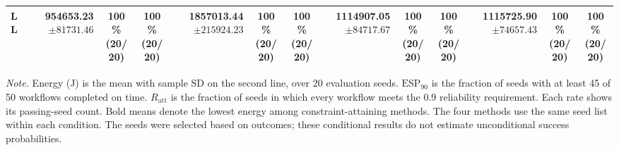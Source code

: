 \documentclass[10pt]{article}
\begin{document}
\begin{table}[!htbp]
\begin{tabular}{@{}l*{4}{rcc}@{}}
LL & \shortstack[r]{\textbf{954653.23}\\$\pm 81731.46$} & \shortstack[c]{100\%\\(20/20)} & \shortstack[c]{100\%\\(20/20)} & \shortstack[r]{1857013.44\\$\pm 215924.23$} & \shortstack[c]{100\%\\(20/20)} & \shortstack[c]{100\%\\(20/20)} & \shortstack[r]{1114907.05\\$\pm 84717.67$} & \shortstack[c]{100\%\\(20/20)} & \shortstack[c]{100\%\\(20/20)} & \shortstack[r]{1115725.90\\$\pm 74657.43$} & \shortstack[c]{100\%\\(20/20)} & \shortstack[c]{100\%\\(20/20)} \\
\bottomrule
\end{tabular}
\par\vspace{3pt}
\parbox{\textwidth}{\footnotesize
\textit{Note.} Energy (J) is the mean with sample SD on the second line, over 20 evaluation seeds.
$\mathrm{ESP}_{90}$ is the fraction of seeds with at least 45 of 50 workflows completed on time.
$R_{\mathrm{att}}$ is the fraction of seeds in which every workflow meets the 0.9 reliability requirement.
Each rate shows its passing-seed count. Bold means denote the lowest energy among constraint-attaining methods.
The four methods use the same seed list within each condition.
The seeds were selected based on outcomes; these conditional results do not estimate unconditional success probabilities.}
\endgroup
\end{table}
\clearpage
\end{document}
